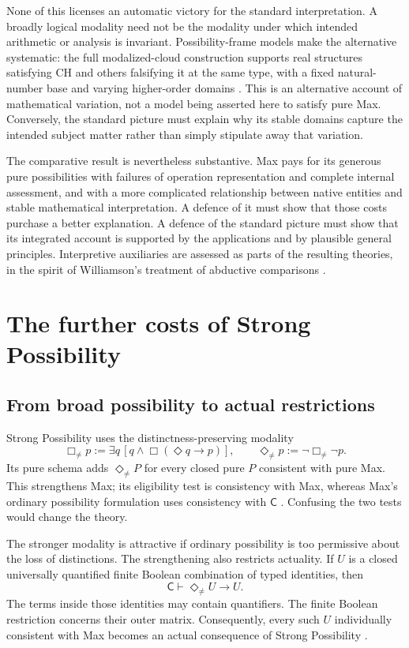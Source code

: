 \documentclass[12pt,letterpaper]{article}
\newcommand{\C}{\mathsf C}
\begin{document}
None of this licenses an automatic victory for the standard interpretation. A broadly logical modality need not be the modality under which intended arithmetic or analysis is invariant. Possibility-frame models make the alternative systematic: the full modalized-cloud construction supports real structures satisfying CH and others falsifying it at the same type, with a fixed natural-number base and varying higher-order domains \citep[\S\S1, 6--7]{cloudtransfer}. This is an alternative account of mathematical variation, not a model being asserted here to satisfy pure Max. Conversely, the standard picture must explain why its stable domains capture the intended subject matter rather than simply stipulate away that variation.

The comparative result is nevertheless substantive. Max pays for its generous pure possibilities with failures of operation representation and complete internal assessment, and with a more complicated relationship between native entities and stable mathematical interpretation. A defence of it must show that those costs purchase a better explanation. A defence of the standard picture must show that its integrated account is supported by the applications and by plausible general principles. Interpretive auxiliaries are assessed as parts of the resulting theories, in the spirit of Williamson's treatment of abductive comparisons \citep[\S13.4, pp.~339--342]{williamson2017}.

\section{The further costs of Strong Possibility}\label{sec:sp}

\subsection{From broad possibility to actual restrictions}

Strong Possibility uses the distinctness-preserving modality
\[
 \Box_{\ne}p:=\exists q\,[q\land\Box(\Diamond q\to p)],
 \qquad \Diamond_{\ne}p:=\neg\Box_{\ne}\neg p.
\]
Its pure schema adds $\Diamond_{\ne}P$ for every closed pure $P$ consistent with pure Max. This strengthens Max; its eligibility test is consistency with Max, whereas Max's ordinary possibility formulation uses consistency with $\C$ \citep[\S2.6]{bacondorr}. Confusing the two tests would change the theory.

The stronger modality is attractive if ordinary possibility is too permissive about the loss of distinctions. The strengthening also restricts actuality. If $U$ is a closed universally quantified finite Boolean combination of typed identities, then
\begin{equation}\label{eq:reflection}
 \C\vdash\Diamond_{\ne}U\to U.
\end{equation}
The terms inside those identities may contain quantifiers. The finite Boolean restriction concerns their outer matrix. Consequently, every such $U$ individually consistent with Max becomes an actual consequence of Strong Possibility \citep[\S\S3--4]{spcore}.
\end{document}
